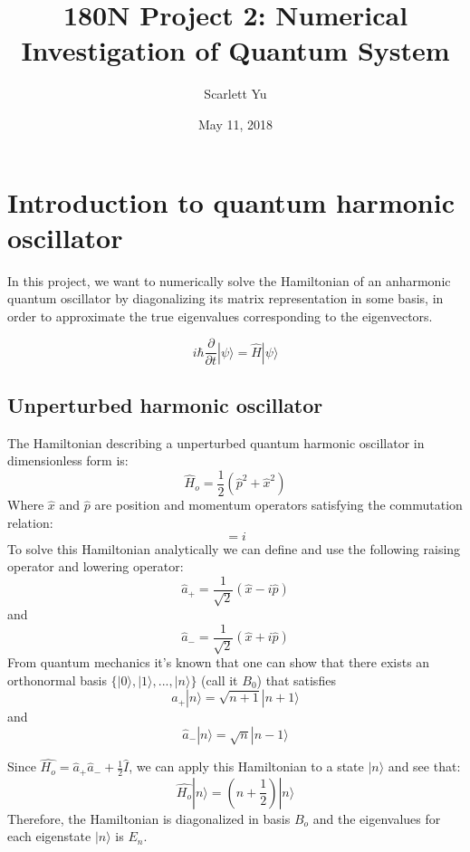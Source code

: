 \documentclass[]{article}
\title{180N Project 2: Numerical Investigation of Quantum System}
\author{Scarlett Yu}
\date{May 11, 2018}
\begin{document}
\maketitle
\section{Introduction to quantum harmonic oscillator}
In this project, we want to numerically solve the Hamiltonian of an anharmonic quantum oscillator by  diagonalizing its matrix representation in some basis, in order to approximate the true eigenvalues corresponding to the eigenvectors.

\begin{equation}
i\hbar\frac{\partial}{\partial t} |\psi \rangle =\hat{H}|\psi \rangle
\end{equation}

\subsection{Unperturbed harmonic oscillator}
The Hamiltonian describing a unperturbed quantum harmonic oscillator in dimensionless form is:  
\begin{equation}
	\hat{H}_o=\frac{1}{2}(\hat{p}^2+\hat{x}^2)
\end{equation}
Where $\hat{x}$ and $\hat{p}$ are position and momentum operators satisfying the commutation relation:
\begin{equation}
	[\hat{x}, \hat{p}]=i
\end{equation}
To solve this Hamiltonian analytically we can define and use the following raising operator and lowering operator:
\begin{equation}
\hat{a}_+=\frac{1}{\sqrt{2}}(\hat{x}-i\hat{p})
\end{equation}
and \begin{equation}
\hat{a}_-=\frac{1}{\sqrt{2}}(\hat{x}+i\hat{p})
\end{equation}
From quantum mechanics it's known that one can show that there exists an orthonormal basis  $\lbrace |0 \rangle,  |1 \rangle, ..., |n \rangle  \rbrace$ (call it $B_0$) that satisfies 
\begin{equation}
	\hat{a}_+|n \rangle =\sqrt{n+1}|n+1 \rangle 
\end{equation}
and \begin{equation}
	\hat{a}_- |n \rangle =\sqrt{n}|n-1 \rangle 
\end{equation}

Since $\hat{H_o}=	\hat{a}_+	\hat{a}_-+\frac{1}{2}\hat{I}$, we can apply this Hamiltonian to a state $|n \rangle$ and see that:
\begin{equation}
	\hat{H_o}|n \rangle=(n+\frac{1}{2})|n \rangle
\end{equation}
Therefore, the Hamiltonian is diagonalized in basis $B_o$ and the eigenvalues for each eigenstate $|n \rangle$ is $E_n$.
\end{document}
